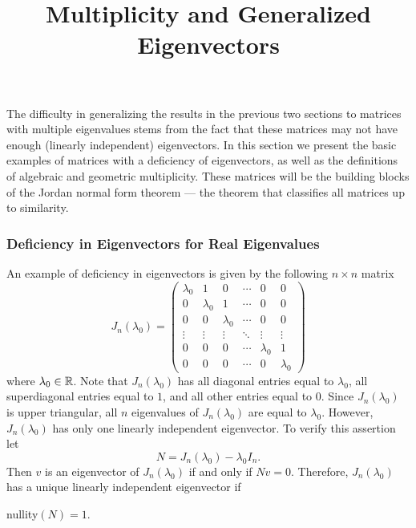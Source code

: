 \documentclass{ximera}
\title{Multiplicity and Generalized Eigenvectors}
\begin{document}
\begin{abstract}
\end{abstract}
\maketitle

  \label{S:MGE}

The difficulty in generalizing the results in the previous two sections to
matrices with multiple eigenvalues stems from the fact that these matrices 
may not have enough (linearly independent) eigenvectors.  In this section we 
present the basic examples of matrices with a deficiency of eigenvectors, as
well as the definitions of algebraic and geometric multiplicity.  These 
matrices will be the building blocks of the Jordan normal form theorem --- 
the theorem that classifies all matrices up to similarity.

\subsubsection*{Deficiency in Eigenvectors for Real Eigenvalues}

An example of deficiency in eigenvectors is given by the following 
$n\times n$ matrix
\begin{equation}  \label{E:JnR}
J_n(\lambda_0)=\left(\begin{array}{cccccc} \lambda_0 & 1 & 0 & \cdots & 0 & 0\\
	0 & \lambda_0 & 1 & \cdots & 0 & 0 \\
	0 & 0 & \lambda_0  & \cdots & 0 & 0\\
	\vdots & \vdots & \vdots & \ddots & \vdots & \vdots\\
	0 & 0 & 0 & \cdots & \lambda_0 & 1 \\
	0 & 0 & 0 & \cdots & 0 & \lambda_0 \end{array}\right)
\end{equation}
where $\lambda_0\in\mbox{$\Bbb{R}$}$.  Note that $J_n(\lambda_0)$ has all diagonal 
entries equal to $\lambda_0$,
all superdiagonal entries equal to $1$, and all other entries equal 
to $0$. Since $J_n(\lambda_0)$ is upper triangular, all $n$ 
eigenvalues of $J_n(\lambda_0)$ are equal to $\lambda_0$.  However,
$J_n(\lambda_0)$ has only one linearly independent eigenvector.  To 
verify this assertion let 
\[
N = J_n(\lambda_0) - \lambda_0I_n.
\]
Then $v$ is an eigenvector of $J_n(\lambda_0)$ if and only if $Nv=0$.
Therefore, $J_n(\lambda_0)$ has a unique linearly independent 
eigenvector  if 
\begin{lemma}
{\rm nullity}$(N)=1$.
\end{lemma}
\end{document}
